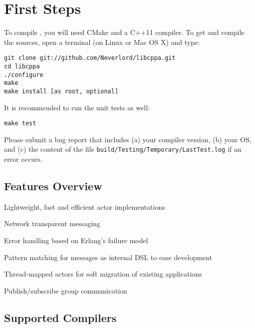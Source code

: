 \section{First Steps}



To compile \libcppa, you will need CMake and a C++11 compiler. To get and compile the sources, open a terminal (on Linux or Mac OS X) and type:

\begin{verbatim}
git clone git://github.com/Neverlord/libcppa.git
cd libcppa
./configure
make
make install [as root, optional]
\end{verbatim}

It is recommended to run the unit tests as well:

\begin{verbatim}
make test
\end{verbatim}

Please submit a bug report that includes (a) your compiler version, (b) your OS, and (c) the content of the file \texttt{build/Testing/Temporary/LastTest.log} if an error occurs.

\subsection{Features Overview}

\begin{itemize*}
  \item Lightweight, fast and efficient actor implementations
  \item Network transparent messaging
  \item Error handling based on Erlang's failure model
  \item Pattern matching for messages as internal DSL to ease development
  \item Thread-mapped actors for soft migration of existing applications
  \item Publish/subscribe group communication
\end{itemize*}


\subsection{Supported Compilers}

